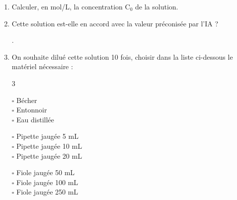 \documentclass[11pt]{article}
\newcommand{\cadreblanc}[1]{%
\medskip\framebox[\linewidth][c]{%
\rule{0mm}{#1mm}}\par
\medskip}
\newcommand\SA{\marginpar{\scalebox{.8}{\framebox[1.6ex]{\rule{0ex}{1.6ex}\raisebox{.75ex}{\rule{1.6ex}{.5pt}}}\hspace{-.3pt}\framebox[3.2ex]{S}}}}
\newcommand\A{\marginpar{\scalebox{.8}{\framebox[1.6ex]{\rule{0ex}{1.6ex}\raisebox{.75ex}{\rule{1.6ex}{.5pt}}}\hspace{-.3pt}\framebox[3.2ex]{A}}}}
\newcommand\R{\marginpar{\scalebox{.8}{\framebox[1.6ex]{\rule{0ex}{1.6ex}\raisebox{.75ex}{\rule{1.6ex}{.5pt}}}\hspace{-.3pt}\framebox[3.2ex]{R}}}}
\newcommand\V{\marginpar{\scalebox{.8}{\framebox[1.6ex]{\rule{0ex}{1.6ex}\raisebox{.75ex}{\rule{1.6ex}{.5pt}}}\hspace{-.3pt}\framebox[3.2ex]{V}}}}
\begin{document}
\begin{enumerate}
\begin{enumerate}
\vfill 

\newpage

\item Calculer, en mol/L, la concentration $\mathrm{C_0}$ de la solution. \R


\begin{minipage}[c]{.91\linewidth}

    \cadreblanc{10}
    
  \end{minipage}
\vspace{3mm}

\item Cette solution est-elle en accord avec la valeur préconisée par l'IA ? \\[0.5cm]

\begin{minipage}[c]{.91\linewidth}

    .\dotfill\\
    
  \end{minipage}\V
\vspace{3mm}




\vfill 




    \item On souhaite dilué cette solution 10 fois, choisir dans la liste ci-dessous le matériel nécessaire :  \\[5mm]
    \SA \A 
\vspace{-10mm}

    \begin{multicols}{3}

    $\square$ Bécher \\
    $\square$ Entonnoir \\
    $\square$ Eau distillée 
    \columnbreak

    
    $\square$ Pipette jaugée 5 mL \\
    $\square$ Pipette jaugée 10 mL \\
    $\square$ Pipette jaugée 20 mL 

        \columnbreak


    $\square$ Fiole jaugée 50 mL \\
    $\square$ Fiole jaugée 100 mL  \\
    $\square$ Fiole jaugée 250 mL 

    \end{multicols}

    \vfill


\end{enumerate}
\end{enumerate}
\end{document}
